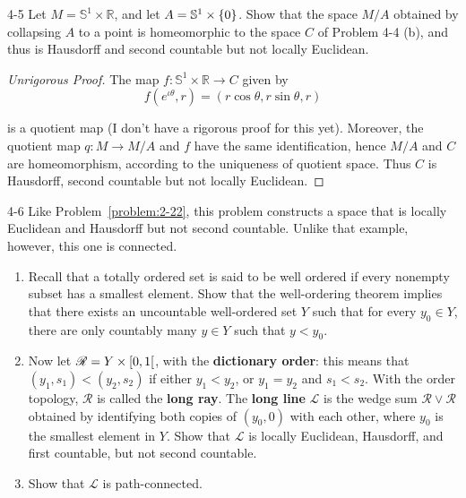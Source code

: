 \begin{problem}{4-5}
Let $M = \mathbb{S}^{1}\times\mathbb{R}$, and let $A = \mathbb{S}^{1} \times \left\{{0}\right\}$. Show that the space $M/A$ obtained by collapsing $A$ to a point is homeomorphic to the space $C$ of Problem 4-4 (b), and thus is Hausdorff and second countable but not locally Euclidean.
\end{problem}

\begin{proof}[Unrigorous Proof]
	The map $f: \mathbb{S}^{1}\times\mathbb{R} \to C$ given by
	\begin{equation*}
		f(e^{\iota\theta}, r) = (r\cos\theta, r\sin\theta, r)
	\end{equation*}

	is a quotient map (I don't have a rigorous proof for this yet). Moreover, the quotient map $q: M\to M/A$ and $f$ have the same identification, hence $M/A$ and $C$ are homeomorphism, according to the uniqueness of quotient space. Thus $C$ is Hausdorff, second countable but not locally Euclidean.
\end{proof}

\begin{problem}{4-6}
Like Problem~\ref{problem:2-22}, this problem constructs a space that is locally Euclidean and Hausdorff but not second countable. Unlike that example, however, this one is connected.
\begin{enumerate}[label={(\alph*)}]
	\item Recall that a totally ordered set is said to be well ordered if every nonempty subset has a smallest element. Show that the well-ordering theorem implies that there exists an uncountable well-ordered set $Y$ such that for every $y_{0}\in Y$, there are only countably many $y\in Y$ such that $y < y_{0}$.
	\item Now let $\mathscr{R} = Y \times \left[{0,1}\right[$, with the \textbf{dictionary order}: this means that $(y_{1}, s_{1}) < (y_{2}, s_{2})$ if either $y_{1} < y_{2}$, or $y_{1} = y_{2}$ and $s_{1} < s_{2}$. With the order topology, $\mathscr{R}$ is called the \textbf{long ray}. The \textbf{long line} $\mathscr{L}$ is the wedge sum $\mathscr{R}\vee \mathscr{R}$ obtained by identifying both copies of $(y_{0}, 0)$ with each other, where $y_{0}$ is the smallest element in $Y$. Show that $\mathscr{L}$ is locally Euclidean, Hausdorff, and first countable, but not second countable.
	\item Show that $\mathscr{L}$ is path-connected.
\end{enumerate}
\end{problem}

